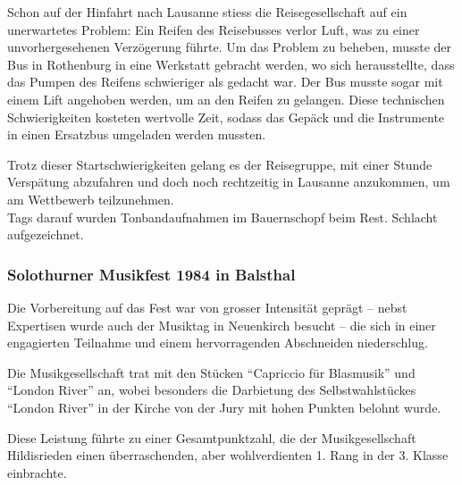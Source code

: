 \begin{history}
    Schon auf der Hinfahrt nach Lausanne stiess die Reisegesellschaft auf ein
    unerwartetes Problem: Ein Reifen des Reisebusses verlor Luft, was zu einer
    unvorhergesehenen Verzögerung führte. Um das Problem zu beheben, musste der
    Bus in Rothenburg in eine Werkstatt gebracht werden, wo sich herausstellte,
    dass das Pumpen des Reifens schwieriger als gedacht war. Der Bus musste
    sogar mit einem Lift angehoben werden, um an den Reifen zu gelangen. Diese
    technischen Schwierigkeiten kosteten wertvolle Zeit, sodass das Gepäck und
    die Instrumente in einen Ersatzbus umgeladen werden mussten.

    Trotz dieser Startschwierigkeiten gelang es der Reisegruppe, mit einer
    Stunde Verspätung abzufahren und doch noch rechtzeitig in Lausanne
    anzukommen, um am Wettbewerb teilzunehmen.\\

    Tags darauf wurden Tonbandaufnahmen im Bauernschopf beim Rest. Schlacht
    aufgezeichnet.


    \subsubsection*{Solothurner Musikfest 1984 in Balsthal}

    Die Vorbereitung auf das Fest war von grosser Intensität geprägt -- nebst
    Expertisen wurde auch der Musiktag in Neuenkirch besucht -- die sich in
    einer engagierten Teilnahme und einem hervorragenden Abschneiden
    niederschlug.

    Die Musikgesellschaft trat mit den Stücken \enquote{Capriccio für Blasmusik}
    und \enquote{London River} an, wobei besonders die Darbietung des
    Selbstwahlstückes \enquote{London River} in der Kirche von der Jury mit
    hohen Punkten belohnt wurde.

    Diese Leistung führte zu einer Gesamtpunktzahl, die der Musikgesellschaft
    Hildisrieden einen überraschenden, aber wohlverdienten 1. Rang in der 3.
    Klasse einbrachte.

\end{history}

